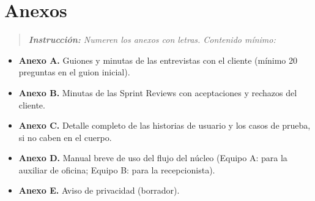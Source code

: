 \section{Anexos}\label{anexos}

\begin{quote}
\emph{\textbf{Instrucción:} Numeren los anexos con letras. Contenido
mínimo:}
\end{quote}

\begin{itemize}
\item
  \textbf{Anexo A.} Guiones y minutas de las entrevistas con el cliente
  (mínimo 20 preguntas en el guion inicial).
\item
  \textbf{Anexo B.} Minutas de las Sprint Reviews con aceptaciones y
  rechazos del cliente.
\item
  \textbf{Anexo C.} Detalle completo de las historias de usuario y los
  casos de prueba, si no caben en el cuerpo.
\item
  \textbf{Anexo D.} Manual breve de uso del flujo del núcleo (Equipo A:
  para la auxiliar de oficina; Equipo B: para la recepcionista).
\item
  \textbf{Anexo E.} Aviso de privacidad (borrador).
\end{itemize}

